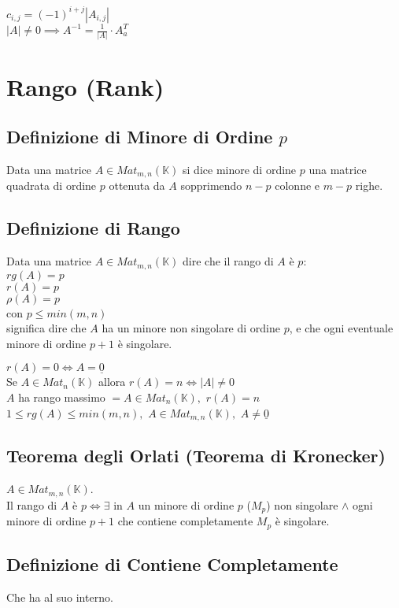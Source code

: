 \documentclass[a4paper, twoside, italian, 11pt]{book}
\newcommand{\K}{\mathbb{K}}
\begin{document}
\noindent
$c_{i,j} = (-1)^{i+j} \left | A_{i,j} \right |$ \\

\noindent
$\left | A \right | \neq 0 \implies A^{-1} = \frac{1}{\left | A \right |} \cdot A_a^T$



\section{Rango (Rank)}



\subsection{Definizione di Minore di Ordine $p$}

Data una matrice $A \in Mat_{m,n}(\K)$ si dice minore di ordine $p$ una matrice quadrata di ordine $p$ ottenuta da $A$ sopprimendo $n-p$ colonne e $m-p$ righe.


\subsection{Definizione di Rango}

Data una matrice $A \in Mat_{m,n}(\K)$ dire che il rango di $A$ è $p$: \\

\noindent
$rg(A) = p$ \\
$r(A) = p$ \\
$\rho(A) = p$ \\

\noindent
con $p \leq min(m, n)$ \\

\noindent
significa dire che $A$ ha un minore non singolare di ordine $p$, e che ogni eventuale minore di ordine $p + 1$ è singolare.

\noindent
$r(A) = 0 \iff A = \underline{0}$ \\

\noindent
Se $A \in Mat_n(\K)$ allora $r(A) = n \iff \left | A \right | \neq 0$ \\

\noindent
$A$ ha rango massimo $= A \in Mat_n(\K),$ $r(A) = n$ \\

\noindent
$1 \leq rg(A) \leq min(m,n),$ $A \in Mat_{m,n}(\K),$ $A \neq \underline{0}$


\subsection{Teorema degli Orlati (Teorema di Kronecker)}

$A \in Mat_{m,n}(\K)$.\\
Il rango di $A$ è $p \iff \exists$ in $A$ un minore di ordine $p$ ($M_p$) non singolare $\land$ ogni minore di ordine $p + 1$ che contiene completamente $M_p$ è singolare.


\subsection{Definizione di Contiene Completamente}
Che ha al suo interno.
\end{document}
